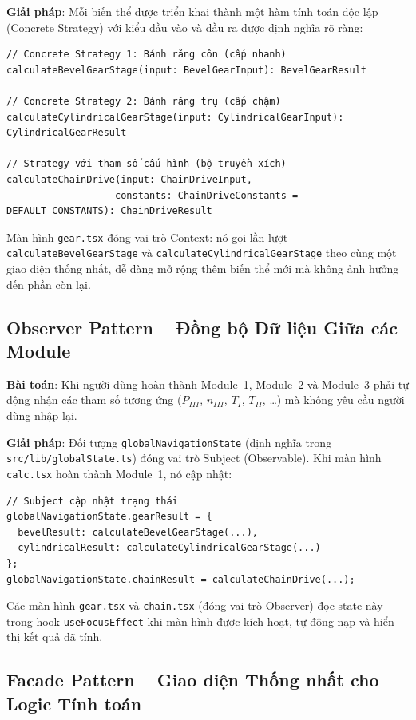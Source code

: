 \textbf{Giải pháp}: Mỗi biến thể được triển khai thành một hàm tính toán độc lập
(Concrete Strategy) với kiểu đầu vào và đầu ra được định nghĩa rõ ràng:

\begin{verbatim}
// Concrete Strategy 1: Bánh răng côn (cấp nhanh)
calculateBevelGearStage(input: BevelGearInput): BevelGearResult

// Concrete Strategy 2: Bánh răng trụ (cấp chậm)
calculateCylindricalGearStage(input: CylindricalGearInput): CylindricalGearResult

// Strategy với tham số cấu hình (bộ truyền xích)
calculateChainDrive(input: ChainDriveInput,
                   constants: ChainDriveConstants = DEFAULT_CONSTANTS): ChainDriveResult
\end{verbatim}

Màn hình \texttt{gear.tsx} đóng vai trò Context: nó gọi lần lượt
\texttt{calculateBevelGearStage} và \texttt{calculateCylindricalGearStage}
theo cùng một giao diện thống nhất, dễ dàng mở rộng thêm biến thể mới mà không
ảnh hưởng đến phần còn lại.

\subsection{Observer Pattern -- Đồng bộ Dữ liệu Giữa các Module}

\textbf{Bài toán}: Khi người dùng hoàn thành Module~1,
Module~2 và Module~3 phải tự động nhận các tham số tương ứng
($P_{III}$, $n_{III}$, $T_I$, $T_{II}$, \ldots) mà không yêu cầu người dùng nhập lại.

\textbf{Giải pháp}: Đối tượng \texttt{globalNavigationState}
(định nghĩa trong \texttt{src/lib/globalState.ts}) đóng vai trò Subject (Observable).
Khi màn hình \texttt{calc.tsx} hoàn thành Module~1, nó cập nhật:

\begin{verbatim}
// Subject cập nhật trạng thái
globalNavigationState.gearResult = {
  bevelResult: calculateBevelGearStage(...),
  cylindricalResult: calculateCylindricalGearStage(...)
};
globalNavigationState.chainResult = calculateChainDrive(...);
\end{verbatim}

Các màn hình \texttt{gear.tsx} và \texttt{chain.tsx} (đóng vai trò Observer)
đọc state này trong hook \texttt{useFocusEffect} khi màn hình được kích hoạt,
tự động nạp và hiển thị kết quả đã tính.

\subsection{Facade Pattern -- Giao diện Thống nhất cho Logic Tính toán}

